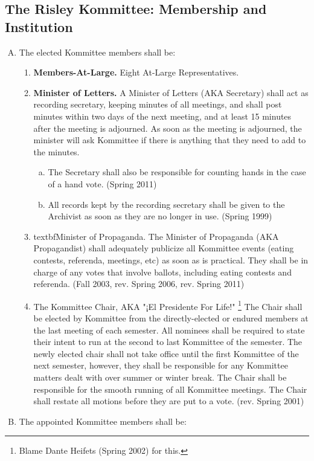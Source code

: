 \documentclass[12pt]{article}
\begin{document}
\begin{enumerate}[A.]
\section{The Risley Kommittee: Membership and Institution}
\begin{enumerate}[A.] 
\item The elected Kommittee members shall be:
\begin{enumerate}[1.]
\item \textbf{Members-At-Large.} Eight At-Large Representatives.
\item \textbf{Minister of Letters.} A Minister of Letters (AKA Secretary) shall act as recording secretary, keeping minutes of all meetings, and shall post minutes within two days of the next meeting, and at least 15 minutes after the meeting is adjourned. As soon as the meeting is adjourned, the minister will ask Kommittee if there is anything that they need to add to the minutes.
\begin{enumerate}[a.]
\item The Secretary shall also be responsible for counting hands in the case of a hand vote. (Spring 2011)
\item All records kept by the recording secretary shall be given to the Archivist as soon as they are no longer in use. (Spring 1999)
\end{enumerate}
\item textbf{Minister of Propaganda.} The Minister of Propaganda (AKA Propagandist) shall adequately publicize all Kommittee events (eating contests, referenda, meetings, etc) as soon as is practical. They shall be in charge of any votes that involve ballots, including eating contests and referenda. (Fall 2003, rev. Spring 2006, rev. Spring 2011)
\item The Kommittee Chair, AKA "¡El Presidente For Life!" \footnote{Blame Dante Heifets (Spring 2002) for this.} The Chair shall be elected by Kommittee from the directly-elected or endured members at the last meeting of each semester. All nominees shall be required to state their intent to run at the second to last Kommittee of the semester. The newly elected chair shall not take office until the first Kommittee of the next semester, however, they shall be responsible for any Kommittee matters dealt with over summer or winter break. The Chair shall be responsible for the smooth running of all Kommittee meetings. The Chair shall restate all motions before they are put to a vote. (rev. Spring 2001)
\end{enumerate}
\item The appointed Kommittee members shall be:

\end{enumerate}
\end{enumerate}
\end{document}
